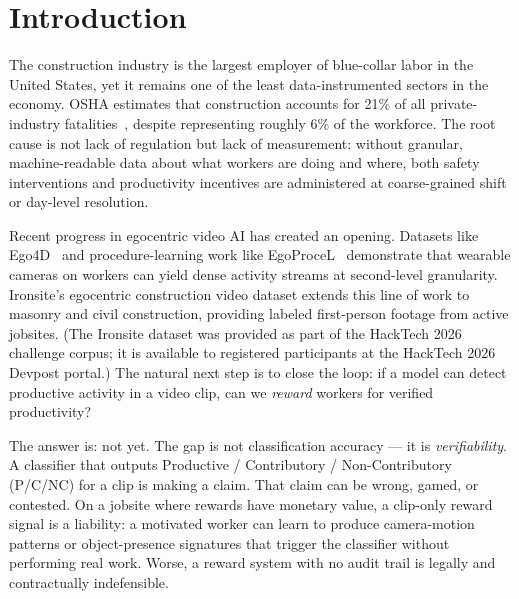 \documentclass[sigconf,nonacm]{acmart}
\begin{document}

\maketitle

\section{Introduction}

The construction industry is the largest employer of blue-collar labor in the
United States, yet it remains one of the least data-instrumented sectors in the
economy. OSHA estimates that construction accounts for 21\% of all
private-industry fatalities~\cite{osha1926}, despite representing roughly 6\%
of the workforce. The root cause is not lack of regulation but lack of
measurement: without granular, machine-readable data about what workers are
doing and where, both safety interventions and productivity incentives are
administered at coarse-grained shift or day-level resolution.

Recent progress in egocentric video AI has created an opening. Datasets like
Ego4D~\cite{grauman2022ego4d} and procedure-learning work like
EgoProceL~\cite{egoprocel} demonstrate that wearable cameras on workers can
yield dense activity streams at second-level granularity. Ironsite's egocentric
construction video dataset extends this line of work to masonry and civil
construction, providing labeled first-person footage from active jobsites.
(The Ironsite dataset was provided as part of the HackTech 2026 challenge
corpus; it is available to registered participants at the HackTech 2026
Devpost portal.) The natural next step is to close the loop: if a model can
detect productive activity in a video clip, can we \emph{reward} workers for
verified productivity?

The answer is: not yet. The gap is not classification accuracy --- it is
\emph{verifiability}. A classifier that outputs Productive / Contributory /
Non-Contributory (P/C/NC) for a clip is making a claim. That claim can be
wrong, gamed, or contested. On a jobsite where rewards have monetary value, a
clip-only reward signal is a liability: a motivated worker can learn to produce
camera-motion patterns or object-presence signatures that trigger the classifier
without performing real work. Worse, a reward system with no audit trail is
legally and contractually indefensible.
\end{document}
